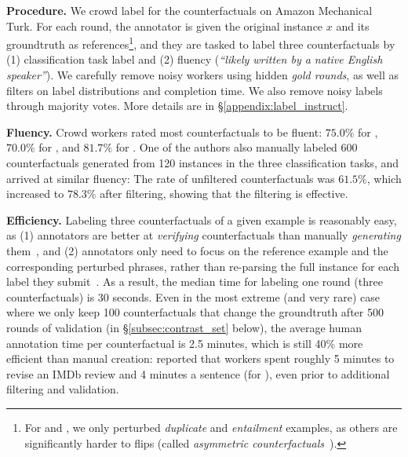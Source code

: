 \textbf{Procedure.}
We crowd label for the counterfactuals on Amazon Mechanical Turk. 
For each round, the annotator is given the original instance $x$ and its groundtruth as references\footnote{For \qqp and \nli, we only perturbed \emph{duplicate} and \emph{entailment} examples, as others are significantly harder to flips (called \emph{asymmetric counterfactuals}~\cite{garg2019counterfactual}).}, and they are tasked to label three counterfactuals by (1) classification task label and (2) fluency (\emph{``likely written by a native English speaker''}). 
We carefully remove noisy workers using hidden \emph{gold rounds}, as well as filters on label distributions and completion time.
We also remove noisy labels through majority votes.
More details are in \S\ref{appendix:label_instruct}. 

\textbf{Fluency.}
Crowd workers rated most counterfactuals to be fluent: $75.0\%$ for \dsst, $70.0\%$ for \dqqp, and $81.7\%$ for \dnli.
One of the authors also manually labeled 600 counterfactuals generated from 120 instances in the three classification tasks, and arrived at similar fluency:
The rate of unfiltered counterfactuals was $61.5\%$, which increased to $78.3\%$ after filtering, showing that the filtering is effective.

\textbf{Efficiency.}
Labeling three counterfactuals of a given example is reasonably easy, as (1) annotators are better at \emph{verifying} counterfactuals than manually \emph{generating} them~\cite{ribeiro2018sear}, and (2) annotators only need to focus on the reference example and the corresponding perturbed phrases, rather than re-parsing the full instance for each label they submit~\cite{Khashabi2020MoreBF}.
As a result, the median time for labeling one round (three counterfactuals) is 30 seconds.
Even in the most extreme (and very rare) case where we only keep 100 counterfactuals that change the groundtruth after 500 rounds of validation (\sst in \S\ref{subsec:contrast_set} below), the average human annotation time per counterfactual is 2.5 minutes, which is still 40\% more efficient than manual creation:
\citet{kaushik2019learning} reported that workers spent roughly 5 minutes to revise an IMDb review and 4 minutes a sentence (for \nli), even prior to additional filtering and validation.



